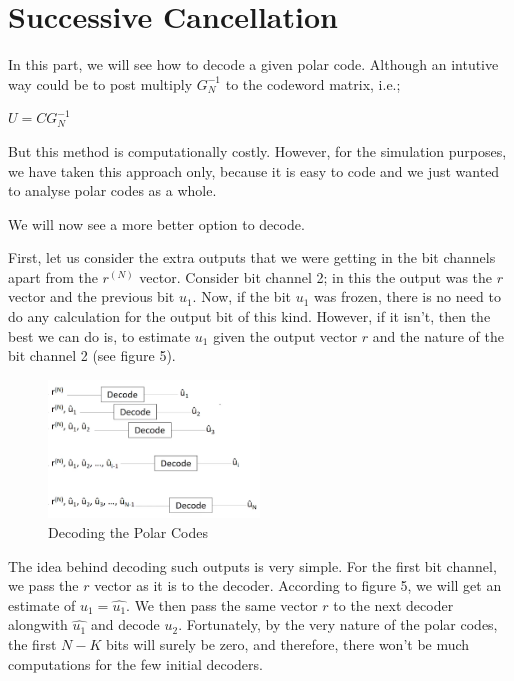 \documentclass[twocolumn]{report}
\begin{document}
\section{Successive Cancellation}
In this part, we will see how to decode a given polar code. Although an intutive way could be to post multiply $G_{N}^{-1}$ to the codeword matrix, i.e.;
\begin{center}
$U = CG_{N}^{-1}$
\end{center} 
But this method is computationally costly. However, for the simulation purposes, we have taken this approach only, because it is easy to code and we just wanted to analyse polar codes as a whole.
\par We will now see a more better option to decode.
\par First, let us consider the extra outputs that we were getting in the bit channels apart from the $r^{(N)}$ vector. Consider bit channel 2; in this the output was the $r$ vector and the previous bit $u_{1}$. Now, if the bit $u_{1}$ was frozen, there is no need to do any calculation for the output bit of this kind. However, if it isn't, then the best we can do is, to estimate $u_{1}$ given the output vector $r$ and the nature of the bit channel 2 (see figure 5).
\begin{figure}[H]
\centering 
\includegraphics[width=0.5\textwidth, height=0.22\textheight]{decode.png}
\caption{Decoding the Polar Codes}
\end{figure}
The idea behind decoding such outputs is very simple. For the first bit channel, we pass the $r$ vector as it is to the decoder. According to figure 5, we will get an estimate of $u_{1}=\hat{u_{1}}$. We then pass the same vector $r$ to the next decoder alongwith $\hat{u_{1}}$ and decode $u_{2}$. Fortunately, by the very nature of the polar codes, the first $N-K$ bits will surely be zero, and therefore, there won't be much computations for the few initial decoders. 
\end{document}
